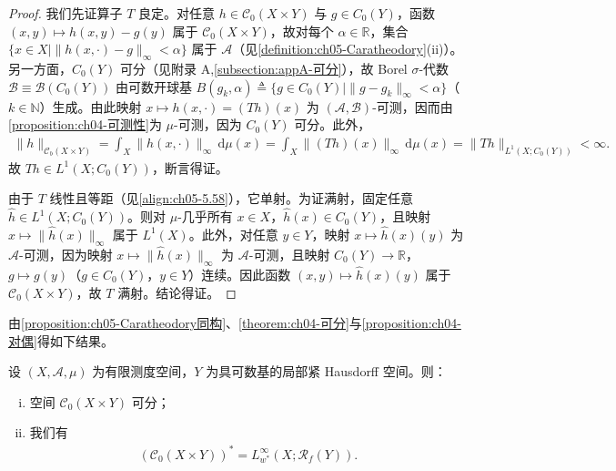 \documentclass[../../main.tex]{subfiles}%
\begin{document}
\begin{proof}
我们先证算子 $T$ 良定。对任意 $h\in\mathcal{C}_0(X\times Y)$ 与 $g\in C_0(Y)$，函数 $(x,y)\mapsto h(x,y)-g(y)$ 属于 $\mathcal{C}_0(X\times Y)$，故对每个 $\alpha\in\mathbb{R}$，集合 $\{x\in X\mid\|h(x,\cdot)-g\|_\infty<\alpha\}$ 属于 $\mathcal{A}$（见\cref{definition:ch05-Caratheodory}(ii)）。另一方面，$C_0(Y)$ 可分（见附录 A,\cref{subsection:appA-可分}），故 Borel $\sigma$-代数 $\mathscr{B}\equiv\mathscr{B}(C_0(Y))$ 由可数开球基 $B(g_k,\alpha)\triangleq \{g\in C_0(Y)\mid\|g-g_k\|_\infty<\alpha\}$（$k\in\mathbb{N}$）生成。由此映射 $x\mapsto h(x,\cdot)=(Th)(x)$ 为 $(\mathcal{A},\mathscr{B})$-可测，因而由\cref{proposition:ch04-可测性}为 $\mu$-可测，因为 $C_0(Y)$ 可分。此外，
\begin{align}
\|h\|_{\mathcal{C}_b(X\times Y)}
=\int_X\|h(x,\cdot)\|_\infty\,\mathrm{d}\mu(x)
=\int_X\|(Th)(x)\|_\infty\,\mathrm{d}\mu(x)
=\|Th\|_{L^1(X;C_0(Y))}<\infty.\label{align:ch05-5.58}
\end{align}
故 $Th\in L^1(X;C_0(Y))$，断言得证。

由于 $T$ 线性且等距（见\eqref{align:ch05-5.58}），它单射。为证满射，固定任意 $\hat{h}\in L^1(X;C_0(Y))$。则对 $\mu$-几乎所有 $x\in X$，$\hat{h}(x)\in C_0(Y)$，且映射 $x\mapsto\|\hat{h}(x)\|_\infty$ 属于 $L^1(X)$。此外，对任意 $y\in Y$，映射 $x\mapsto\hat{h}(x)(y)$ 为 $\mathcal{A}$-可测，因为映射 $x\mapsto\|\hat{h}(x)\|_\infty$ 为 $\mathcal{A}$-可测，且映射 $C_0(Y)\to\mathbb{R}$，$g\mapsto g(y)$（$g\in C_0(Y)$，$y\in Y$）连续。因此函数 $(x,y)\mapsto\hat{h}(x)(y)$ 属于 $\mathcal{C}_0(X\times Y)$，故 $T$ 满射。结论得证。
\end{proof}

由\cref{proposition:ch05-Caratheodory同构}、\cref{theorem:ch04-可分}与\cref{proposition:ch04-对偶}得如下结果。

\begin{corollary}\label{corollary:ch05-Caratheodory对偶}
设 $(X,\mathcal{A},\mu)$ 为有限测度空间，$Y$ 为具可数基的局部紧 Hausdorff 空间。则：
\begin{enumerate}[(i)]
\item\label{item:ch05-cd-i} 空间 $\mathcal{C}_0(X\times Y)$ 可分；
\item\label{item:ch05-cd-ii} 我们有
\begin{align*}
(\mathcal{C}_0(X\times Y))^*=L^\infty_{w^*}(X;\mathscr{R}_f(Y)).
\end{align*}
\end{enumerate}
\end{corollary}
\end{document}
